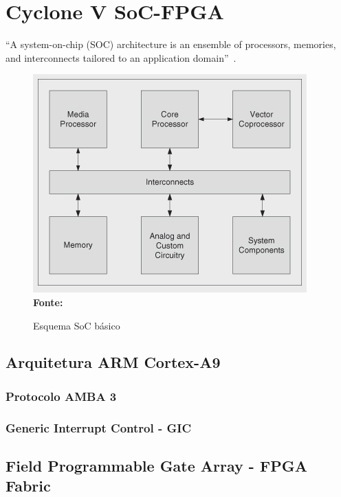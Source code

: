 \chapter{Cyclone V SoC-FPGA}\label{cap:soc}

``A system-on-chip (SOC) architecture is an ensemble of processors, memories, and interconnects tailored to an application domain''~\cite{MichelSoC}.

\begin{figure}[ht]
	\caption{Esquema SoC básico}
	\begin{center}
		\includegraphics[scale=0.75]{imagens/basicsoc.png}\\
		{\small \textbf{Fonte:} }
    \end{center}\label{fig:socbasic}
\end{figure}




\section{Arquitetura ARM Cortex-A9}

\subsection{Protocolo AMBA 3}

\subsection{Generic Interrupt Control - GIC}

\section{Field Programmable Gate Array - FPGA Fabric}


